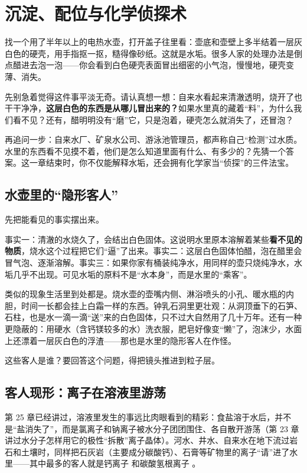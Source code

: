 \chapter{沉淀、配位与化学侦探术}

\begin{kaichang}
找一个用了半年以上的电热水壶，打开盖子往里看：壶底和壶壁上多半结着一层灰白色的硬壳，用手指抠一抠，糙得像砂纸。这就是水垢。很多人家的处理办法是倒点醋进去泡一泡——你会看到白色硬壳表面冒出细密的小气泡，慢慢地，硬壳变薄、消失。

先别急着觉得这件事平淡无奇。请认真想一想：自来水看起来清澈透明，烧开了也干干净净，\textbf{这层白色的东西是从哪儿冒出来的？}如果水里真的藏着“料”，为什么我们看不见？还有，醋明明没有“磨”它，只是泡着，硬壳怎么就消失了，还冒泡？

再追问一步：自来水厂、矿泉水公司、游泳池管理员，都声称自己“检测”过水质。水里的东西看不见摸不着，他们是怎么知道里面有什么、有多少的？先猜一个答案。这一章结束时，你不仅能解释水垢，还会拥有化学家当“侦探”的三件法宝。
\end{kaichang}

\section{水壶里的“隐形客人”}

先把能看见的事实摆出来。

事实一：清澈的水烧久了，会结出白色固体。这说明水里原本溶解着某些\textbf{看不见的物质}，烧水这个过程把它们“逼”了出来。事实二：这层白色固体怕醋，泡在醋里会冒气泡、逐渐溶解。事实三：如果你家有桶装纯净水，用同样的壶只烧纯净水，水垢几乎不出现。可见水垢的原料不是“水本身”，而是水里的“乘客”。

类似的现象生活里到处都是。烧水壶的壶嘴内侧、淋浴喷头的小孔、暖水瓶的内胆，时间一长都会挂上白霜一样的东西。钟乳石洞里更壮观：从洞顶垂下的石笋、石柱，也是水一滴一滴“送”来的白色固体，只不过大自然用了几十万年。还有一种更隐蔽的：用硬水（含钙镁较多的水）洗衣服，肥皂好像变“懒”了，泡沫少，水面上还漂着一层灰白色的浮渣——那也是水里的隐形客人在作怪。

这些客人是谁？要回答这个问题，得把镜头推进到粒子层。

\section{客人现形：离子在溶液里游荡}

第 25 章已经讲过，溶液里发生的事远比肉眼看到的精彩：食盐溶于水后，并不是“盐消失了”，而是氯离子和钠离子被水分子团团围住、各自散开游荡（第 23 章讲过水分子怎样用它的极性“拆散”离子晶体）。河水、井水、自来水在地下流过岩石和土壤时，同样把石灰岩（主要成分碳酸钙）、石膏等矿物里的离子“请”进了水里——其中最多的客人就是钙离子  和碳酸氢根离子 。

